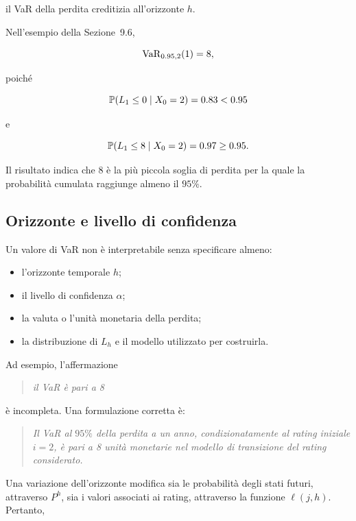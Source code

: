 il VaR della perdita creditizia all'orizzonte $h$.

Nell'esempio della Sezione~9.6,

\[
\operatorname{VaR}_{0.95,2}(1)=8,
\]

poich\'{e}

\[
\mathbb{P}(L_1\leq0\mid X_0=2)=0.83<0.95
\]

e

\[
\mathbb{P}(L_1\leq8\mid X_0=2)=0.97\geq0.95.
\]

Il risultato indica che $8$ \`{e} la pi\`{u} piccola soglia di perdita
per la quale la probabilit\`{a} cumulata raggiunge almeno il $95\%$.

\subsection{Orizzonte e livello di confidenza}

\label{subsec:cap9-orizzonte-confidenza-var}

Un valore di VaR non \`{e} interpretabile senza specificare almeno:

\begin{itemize}

\item l'orizzonte temporale $h$;

\item il livello di confidenza $\alpha$;

\item la valuta o l'unit\`{a} monetaria della perdita;

\item la distribuzione di $L_h$ e il modello utilizzato per
costruirla.

\end{itemize}

Ad esempio, l'affermazione

\begin{quote}
\emph{il VaR \`{e} pari a 8}
\end{quote}

\noindent
\`{e} incompleta. Una formulazione corretta \`{e}:

\begin{quote}
\emph{Il VaR al $95\%$ della perdita a un anno, condizionatamente al
rating iniziale $i=2$, \`{e} pari a 8 unit\`{a} monetarie nel modello
di transizione del rating considerato.}
\end{quote}

Una variazione dell'orizzonte modifica sia le probabilit\`{a} degli
stati futuri, attraverso $P^h$, sia i valori associati ai rating,
attraverso la funzione $\ell(j,h)$. Pertanto,

